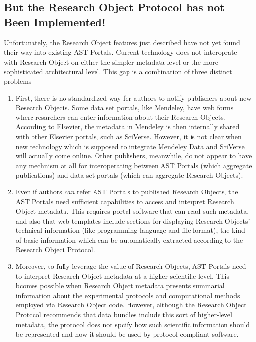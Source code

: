 \documentclass[11pt,letterpaper]{article}
\begin{document}
\subsection{But the Research Object Protocol has not Been Implemented!}
Unfortunately, the Research Object features just described 
have not yet found their way into existing AST  
Portals.  Current technology does not 
interoprate with Research Object on either 
the simpler metadata level or the more sophisticated 
architectural level.  This gap is a combination 
of three distinct problems:
\p{}
\begin{enumerate}
\item First, there is no standardized way for authors 
to notify publishers about new Research Objects.  
Some data set portals, like Mendeley, have 
web forms where resarchers can enter information 
about their Research Objects.  According to Elsevier, 
the metadata in Mendeley is then internally shared 
with other Elsevier portals, such as SciVerse.  
However, it is not clear when new technology 
which is supposed to integrate Mendeley Data and 
SciVerse will actually come online.  
Other publishers, meanwhile, do not appear to have 
any mechnism at all for interoperating between 
AST Portals (which aggregate publications) and 
data set portals (which can aggregate Research Objects).

\item Even if authors \textit{can} refer AST Portals 
to published Research Objects, the AST Portals 
need sufficient capabilities to access and 
interpret Research Object metadata.  This 
requires portal software that can read such metadata, 
and also that web templates include sections for 
displaying Research Objects' technical information 
(like programming language and file format), 
the kind of basic information which can be automatically 
extracted according to the Research Object Protocol.

\item Moreover, to fully leverage the value 
of Research Objects, AST Portals need to interpret 
Research Object metadata at a higher scientific level.  
This bcomes possible when Research Object metadata 
presents summarial information about the 
experimental protocols and computational 
methods employed via Research Object code.  
However, although the Research Object Protocol 
recommends that data bundles include 
this sort of higher-level metadata, 
the protocol does not spcify how 
such scientific information should 
be represented and how it should be used 
by protocol-compliant software.  
\end{enumerate} 
 
\end{document}
